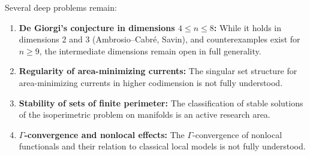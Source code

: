 Several deep problems remain:
\begin{enumerate}
    \item \textbf{De Giorgi's conjecture in dimensions \(4 \leq n \leq 8\):} While it holds in dimensions 2 and 3 (Ambrosio--Cabr\'e, Savin), and counterexamples exist for \(n \geq 9\), the intermediate dimensions remain open in full generality.
    \item \textbf{Regularity of area-minimizing currents:} The singular set structure for area-minimizing currents in higher codimension is not fully understood.
    \item \textbf{Stability of sets of finite perimeter:} The classification of stable solutions of the isoperimetric problem on manifolds is an active research area.
    \item \textbf{\(\Gamma\)-convergence and nonlocal effects:} The \(\Gamma\)-convergence of nonlocal functionals and their relation to classical local models is not fully understood.
\end{enumerate}

